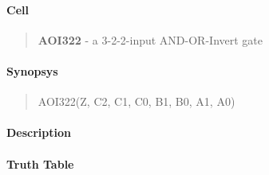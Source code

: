 \label{AOI322}
\paragraph{Cell}
\begin{quote}
    \textbf{AOI322} - a 3-2-2-input AND-OR-Invert gate
\end{quote}

\paragraph{Synopsys}
\begin{quote}
    AOI322(Z, C2, C1, C0, B1, B0, A1, A0)
\end{quote}

\paragraph{Description}

%

\paragraph{Truth Table}


